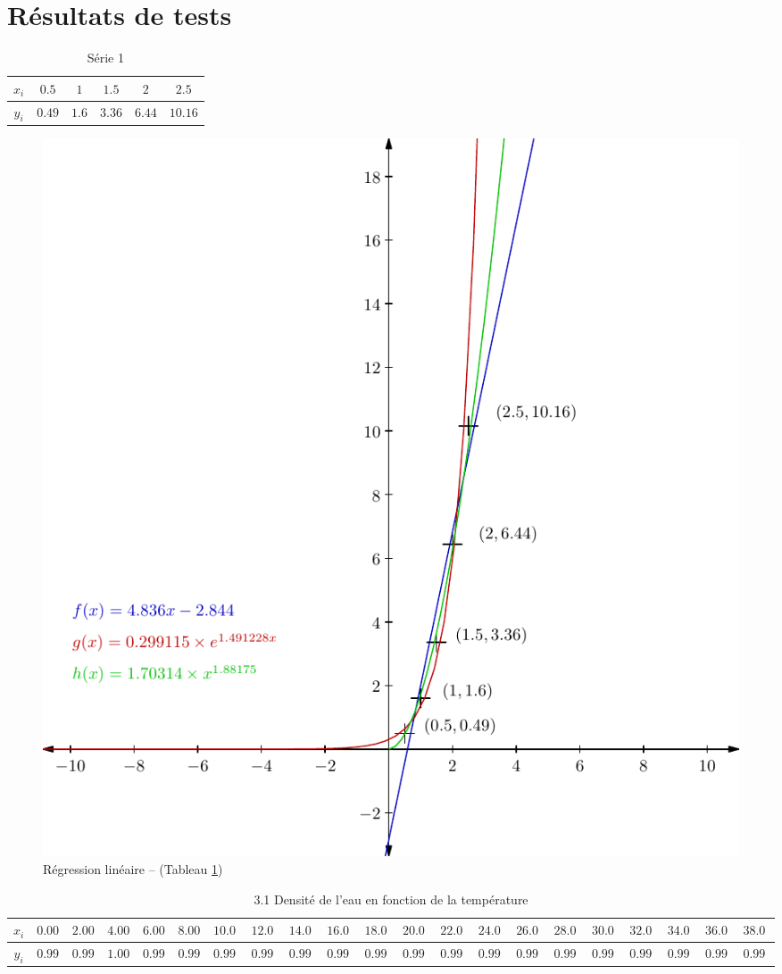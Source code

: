 \documentclass{report}
\begin{document}
    \section{Résultats de tests}
      \begin{table}[h]
	\centering
	\begin{tabular}{| c | c | c | c | c | c |}
	\hline 
	$x_{i}$ & $0.5$ & $1$ & $1.5$ & $2$ & $2.5$ \\ 
	\hline 
	$y_{i}$ & $0.49$ & $1.6$ & $3.36$ & $6.44$ & $10.16$ \\ 
	\hline 
	\end{tabular}
	\caption{Série 1}
	\label{approx_td3_ex6}
      \end{table}
      \begin{figure}[h]
	\centering
	\includegraphics{graphiques/pdf_output/reglin.pdf}
	\caption{Régression linéaire -- (Tableau \ref{approx_td3_ex6})}
      \end{figure}
      \newpage      
      \begin{table}[h]
	\centering
		\begin{tabular}{| c | c | c | c | c | c | c | c | c | c | c | c | c | c | c | c | c | c | c | c | c |}
	\hline 
	$x_{i}$ & $0.000000$ & $2.000000$ & $4.000000$ & $6.000000$ & $8.000000$ & $10.000000$ & $12.000000$ & $14.000000$ & $16.000000$ & $18.000000$ & $20.000000$ & $22.000000$ & $24.000000$ & $26.000000$ & $28.000000$ & $30.000000$ & $32.000000$ & $34.000000$ & $36.000000$ & $38.000000$ \\ 
	\hline 
	$y_{i}$ & $0.999870$ & $0.999970$ & $1.000000$ & $0.999970$ & $0.999880$ & $0.999730$ & $0.999530$ & $0.999530$ & $0.998970$ & $0.998460$ & $0.998050$ & $0.999751$ & $0.997050$ & $0.996500$ & $0.996640$ & $0.995330$ & $0.994720$ & $0.994720$ & $0.993330$ & $0.993260$ \\ 
	\hline 
	\end{tabular}
	\caption{3.1 Densité de l'eau en fonction de la température}
	\label{Jeux d'essais approximation 3.0}
		\end{table}
	
\end{document}
